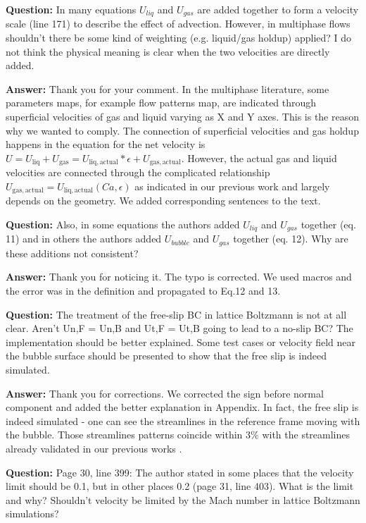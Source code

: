\documentclass{article}
\begin{document}
\textbf{Question:} In many equations $U_{liq}$ and $U_{gas}$ are added together to form a velocity scale (line 171) to describe the effect of advection. However, in multiphase flows shouldn't there be some kind of weighting (e.g. liquid/gas holdup) applied? I do not think the physical meaning is clear when the two velocities are directly added.

\textbf{Answer:} Thank you for your comment.  In the multiphase literature,  some parameters maps, for example flow patterns map, are indicated through superficial velocities of gas and liquid varying as X and Y axes. This is the reason why we wanted to comply. The connection of superficial velocities and gas holdup happens in the equation for the net velocity is $U=U_{\mathrm{liq}} + U_{\mathrm{gas}}=U_{\mathrm{liq,actual}}*\epsilon+U_{\mathrm{gas,actual}}$. However, the actual gas and liquid velocities are connected through the complicated relationship $U_{\mathrm{gas,actual}}=U_{\mathrm{liq,actual}}(Ca,\epsilon)$ as indicated in our previous work and largely depends on the geometry. We added corresponding sentences to the text.

\textbf{Question:} Also, in some equations the authors added $U_{liq}$ and $U_{gas}$ together (eq. 11) and in others the authors added $U_{bubble}$ and $U_{gas}$ together (eq. 12). Why are these additions not consistent?

\textbf{Answer:} Thank you for noticing it. The typo is corrected. We used macros and the error was in the definition and propagated to Eq.12 and 13.

\textbf{Question:} The treatment of the free-slip BC in lattice Boltzmann is not at all clear. Aren't Un,F = Un,B and Ut,F = Ut,B going to lead to a no-slip BC? The implementation should be better explained. Some test cases or velocity field near the bubble surface should be presented to show that the free slip is indeed simulated.

\textbf{Answer:} Thank you for corrections. We corrected the sign before normal component and added the better explanation in Appendix. In fact, the free slip is indeed simulated  - one can see the streamlines in the reference frame moving with the bubble. Those streamlines patterns coincide within $3\%$ with the streamlines already validated in our previous works \cite{kuzmin-binary2d,kuzmin-binary3d}.

\textbf{Question:} Page 30, line 399: The author stated in some places that the velocity limit should be 0.1, but in other places 0.2 (page 31, line 403). What is the limit and why? Shouldn't velocity be limited by the Mach number in lattice Boltzmann simulations?
\end{document}
